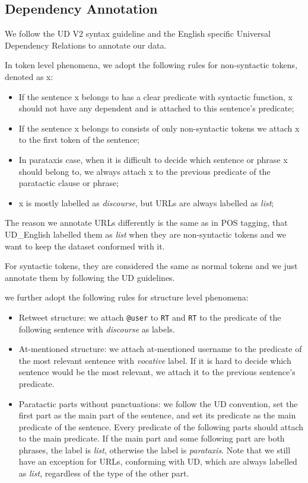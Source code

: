 \documentclass[11pt,letterpaper]{article}
\begin{document}
\subsection{Dependency Annotation}


We follow the UD V2 syntax guideline and the English specific Universal Dependency Relations to annotate our data.

In token level phenomena, we adopt the following rules for non-syntactic tokens, denoted as x: 

\begin{itemize}
\item If the sentence x belongs to has a clear predicate with syntactic function, x should not have any dependent and is attached to this sentence’s predicate;
\item If the sentence x belongs to consists of only non-syntactic tokens we attach x to the first token of the sentence;
\item In parataxis case, when it is difficult to decide which sentence or phrase x should belong to, we always attach x to the previous predicate of the paratactic clause or phrase;
\item x is mostly labelled as {\it discourse}, but URLs are always labelled as {\it list};
\end{itemize}

The reason we annotate URLs differently is the same as in POS tagging, that UD\_English labelled them as {\it list} when they are non-syntactic tokens and we want to keep the dataset conformed with it.

For syntactic tokens, they are considered the same as normal tokens and we just annotate them by following the UD guidelines.

we further adopt the following rules for structure level phenomena:

\begin{itemize}
\item Retweet structure: we attach {\tt @user} to {\tt RT} and {\tt RT} to the predicate of the following sentence with {\it discourse} as labels.
\item At-mentioned structure: we attach at-mentioned username to the predicate of the most relevant sentence with {\it vocative} label. If it is hard to decide which sentence would be the most relevant, we attach it to the previous sentence's predicate.
\item Paratactic parts without punctuations: we follow the UD convention, set the first part as the main part of the sentence, and set its predicate as the main predicate of the sentence. Every predicate of the following parts should attach to the main predicate. If the main part and some following part are both phrases, the label is {\it list}, otherwise the label is {\it parataxis}. Note that we still have an exception for URLs, conforming with UD, which are always labelled as {\it list}, regardless of the type of the other part.
\end{itemize}
\end{document}
